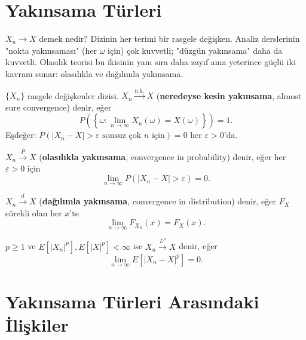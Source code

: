\section{Yakınsama Türleri}
\label{sec:yaklinsama_turleri}

\begin{motivasyon}
$X_n \to X$ demek nedir? Dizinin her terimi bir rasgele değişken.
Analiz derslerinin "nokta yakınsaması" (her $\omega$ için) çok kuvvetli;
"düzgün yakınsama" daha da kuvvetli. Olasılık teorisi bu ikisinin yanı sıra
daha zayıf ama yeterince güçlü iki kavram sunar: olasılıkla ve dağılımla yakınsama.
\end{motivasyon}

\begin{tanim}
\label{def:nk_yaklinsama}
$\{X_n\}$ rasgele değişkenler dizisi. $X_n \xrightarrow{\text{n.k.}} X$
(\textbf{neredeyse kesin yakınsama}, almost sure convergence) denir, eğer
\[
  P\!\left(\left\{\omega : \lim_{n\to\infty} X_n(\omega) = X(\omega)\right\}\right) = 1.
\]
Eşdeğer: $P(|X_n - X| > \varepsilon \text{ sonsuz çok } n \text{ için}) = 0$ her $\varepsilon > 0$'da.
\end{tanim}

\begin{tanim}
\label{def:p_yaklinsama}
$X_n \xrightarrow{P} X$ (\textbf{olasılıkla yakınsama}, convergence in probability) denir, eğer
her $\varepsilon > 0$ için
\[
  \lim_{n\to\infty} P(|X_n - X| > \varepsilon) = 0.
\]
\end{tanim}

\begin{tanim}
\label{def:d_yaklinsama}
$X_n \xrightarrow{d} X$ (\textbf{dağılımla yakınsama}, convergence in distribution) denir, eğer
$F_X$ sürekli olan her $x$'te
\[
  \lim_{n\to\infty} F_{X_n}(x) = F_X(x).
\]
\end{tanim}

\begin{tanim}[$L^p$ Yakınsaması]
\label{def:lp_yaklinsama}
$p \geq 1$ ve $E[|X_n|^p], E[|X|^p] < \infty$ ise $X_n \xrightarrow{L^p} X$ denir, eğer
\[
  \lim_{n\to\infty} E[|X_n - X|^p] = 0.
\]
\end{tanim}

\section{Yakınsama Türleri Arasındaki İlişkiler}
\label{sec:yaklinsama_iliskileri}

